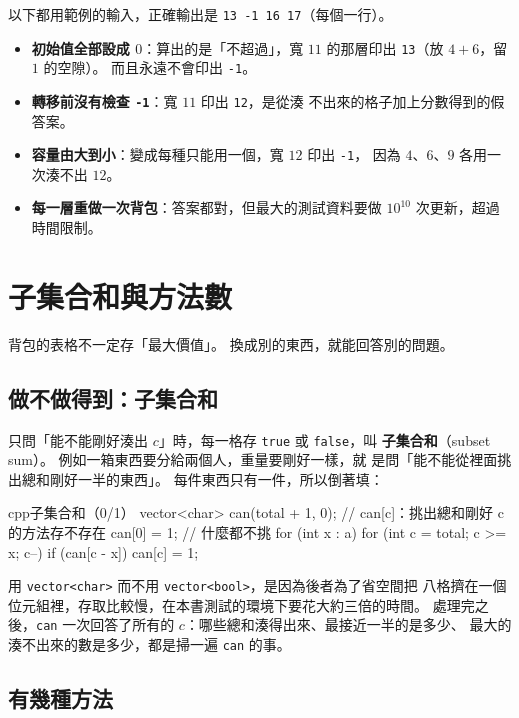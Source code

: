以下都用範例的輸入，正確輸出是 \texttt{13 -1 16 17}（每個一行）。

\begin{itemize}
\item \textbf{初始值全部設成 $0$}：算出的是「不超過」，寬 $11$ 的那層印出
\texttt{13}（放 $4 + 6$，留 $1$ 的空隙）。 而且永遠不會印出 \texttt{-1}。
\item \textbf{轉移前沒有檢查 \texttt{-1}}：寬 $11$ 印出 \texttt{12}，是從湊
不出來的格子加上分數得到的假答案。
\item \textbf{容量由大到小}：變成每種只能用一個，寬 $12$ 印出 \texttt{-1}，
因為 $4$、$6$、$9$ 各用一次湊不出 $12$。
\item \textbf{每一層重做一次背包}：答案都對，但最大的測試資料要做 $10^{10}$
次更新，超過時間限制。
\end{itemize}

\section{子集合和與方法數}
\label{sec:knap-count}

背包的表格不一定存「最大價值」。 換成別的東西，就能回答別的問題。

\subsection{做不做得到：子集合和}

只問「能不能剛好湊出 $c$」時，每一格存 \texttt{true} 或 \texttt{false}，叫
\textbf{子集合和}（subset sum）。 例如一箱東西要分給兩個人，重量要剛好一樣，就
是問「能不能從裡面挑出總和剛好一半的東西」。 每件東西只有一件，所以倒著填：

\begin{code}{cpp}{子集合和（0/1）}
vector<char> can(total + 1, 0);   // can[c]：挑出總和剛好 c 的方法存不存在
can[0] = 1;                       // 什麼都不挑
for (int x : a) {
    for (int c = total; c >= x; c--) {
        if (can[c - x]) {
            can[c] = 1;
        }
    }
}
\end{code}

用 \texttt{vector<char>} 而不用 \texttt{vector<bool>}，是因為後者為了省空間把
八格擠在一個位元組裡，存取比較慢，在本書測試的環境下要花大約三倍的時間。 處理完之
後，\texttt{can} 一次回答了所有的 $c$：哪些總和湊得出來、最接近一半的是多少、
最大的湊不出來的數是多少，都是掃一遍 \texttt{can} 的事。

\subsection{有幾種方法}

